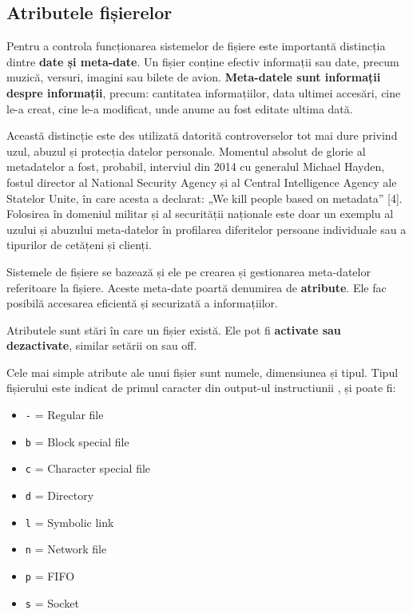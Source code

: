 
\subsection{Atributele fișierelor}

Pentru a controla funcționarea sistemelor de fișiere este importantă distincția
dintre \textbf{date și meta-date}. Un fișier conține efectiv informații sau
date, precum muzică, versuri, imagini sau bilete de avion. \textbf{Meta-datele
sunt informații despre informații}, precum: cantitatea informațiilor, data
ultimei accesări, cine le-a creat, cine le-a modificat, unde anume au fost
editate ultima dată.

Această distincție este des utilizată datorită controverselor tot mai dure
privind uzul, abuzul și protecția datelor personale. Momentul absolut de glorie
al metadatelor a fost, probabil, interviul din 2014 cu generalul Michael Hayden,
fostul director al National Security Agency și al Central Intelligence Agency
ale Statelor Unite, în care acesta a declarat: „We kill people based on
metadata” [4]. Folosirea în domeniul militar și al securității naționale este
doar un exemplu al uzului și abuzului meta-datelor în profilarea diferitelor
persoane individuale sau a tipurilor de cetățeni și clienți.

Sistemele de fișiere se bazează și ele pe crearea și gestionarea meta-datelor referitoare la
fișiere. Aceste meta-date poartă denumirea de \textbf{atribute}. Ele fac posibilă accesarea
eficientă și securizată a informațiilor.

Atributele sunt stări în care un fișier există. Ele pot fi \textbf{activate sau
dezactivate}, similar setării on sau off.

Cele mai simple atribute ale unui fișier sunt numele, dimensiunea și tipul.
Tipul fișierului este indicat de primul caracter din output-ul instructiunii
, și poate fi:


\begin{itemize}
	\item \texttt{-} = Regular file
	\item \texttt{b} = Block special file
	\item \texttt{c} = Character special file
	\item \texttt{d} = Directory
	\item \texttt{l} = Symbolic link
	\item \texttt{n} = Network file
	\item \texttt{p} = FIFO
	\item \texttt{s} = Socket
\end{itemize}



